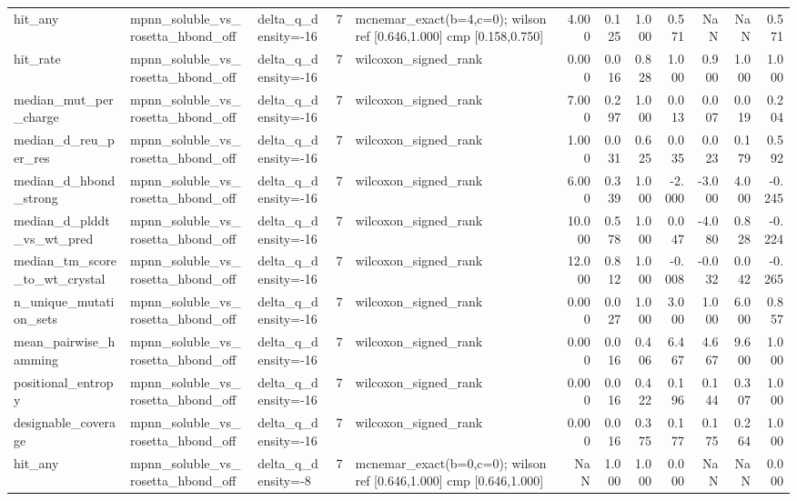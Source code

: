 \begin{table}
{\begin{tabular}{lllrlrrrrrrr}
hit\_any & mpnn\_soluble\_vs\_rosetta\_hbond\_off & delta\_q\_density=-16 & 7 & mcnemar\_exact(b=4,c=0); wilson ref [0.646,1.000] cmp [0.158,0.750] & 4.000 & 0.125 & 1.000 & 0.571 & NaN & NaN & 0.571 \\
hit\_rate & mpnn\_soluble\_vs\_rosetta\_hbond\_off & delta\_q\_density=-16 & 7 & wilcoxon\_signed\_rank & 0.000 & 0.016 & 0.828 & 1.000 & 0.900 & 1.000 & 1.000 \\
median\_mut\_per\_charge & mpnn\_soluble\_vs\_rosetta\_hbond\_off & delta\_q\_density=-16 & 7 & wilcoxon\_signed\_rank & 7.000 & 0.297 & 1.000 & 0.013 & 0.007 & 0.019 & 0.204 \\
median\_d\_reu\_per\_res & mpnn\_soluble\_vs\_rosetta\_hbond\_off & delta\_q\_density=-16 & 7 & wilcoxon\_signed\_rank & 1.000 & 0.031 & 0.625 & 0.035 & 0.023 & 0.179 & 0.592 \\
median\_d\_hbond\_strong & mpnn\_soluble\_vs\_rosetta\_hbond\_off & delta\_q\_density=-16 & 7 & wilcoxon\_signed\_rank & 6.000 & 0.339 & 1.000 & -2.000 & -3.000 & 4.000 & -0.245 \\
median\_d\_plddt\_vs\_wt\_pred & mpnn\_soluble\_vs\_rosetta\_hbond\_off & delta\_q\_density=-16 & 7 & wilcoxon\_signed\_rank & 10.000 & 0.578 & 1.000 & 0.047 & -4.080 & 0.828 & -0.224 \\
median\_tm\_score\_to\_wt\_crystal & mpnn\_soluble\_vs\_rosetta\_hbond\_off & delta\_q\_density=-16 & 7 & wilcoxon\_signed\_rank & 12.000 & 0.812 & 1.000 & -0.008 & -0.032 & 0.042 & -0.265 \\
n\_unique\_mutation\_sets & mpnn\_soluble\_vs\_rosetta\_hbond\_off & delta\_q\_density=-16 & 7 & wilcoxon\_signed\_rank & 0.000 & 0.027 & 1.000 & 3.000 & 1.000 & 6.000 & 0.857 \\
mean\_pairwise\_hamming & mpnn\_soluble\_vs\_rosetta\_hbond\_off & delta\_q\_density=-16 & 7 & wilcoxon\_signed\_rank & 0.000 & 0.016 & 0.406 & 6.467 & 4.667 & 9.600 & 1.000 \\
positional\_entropy & mpnn\_soluble\_vs\_rosetta\_hbond\_off & delta\_q\_density=-16 & 7 & wilcoxon\_signed\_rank & 0.000 & 0.016 & 0.422 & 0.196 & 0.144 & 0.307 & 1.000 \\
designable\_coverage & mpnn\_soluble\_vs\_rosetta\_hbond\_off & delta\_q\_density=-16 & 7 & wilcoxon\_signed\_rank & 0.000 & 0.016 & 0.375 & 0.177 & 0.175 & 0.264 & 1.000 \\
hit\_any & mpnn\_soluble\_vs\_rosetta\_hbond\_off & delta\_q\_density=-8 & 7 & mcnemar\_exact(b=0,c=0); wilson ref [0.646,1.000] cmp [0.646,1.000] & NaN & 1.000 & 1.000 & 0.000 & NaN & NaN & 0.000 \\

\end{tabular}}
\end{table}
